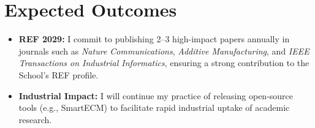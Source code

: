 \documentclass[10pt, a4paper]{article}
\begin{document}
\section*{Expected Outcomes}

\begin{itemize}[leftmargin=*]
    \item \textbf{REF 2029:} I commit to publishing 2--3 high-impact papers annually in journals such as \textit{Nature Communications}, \textit{Additive Manufacturing}, and \textit{IEEE Transactions on Industrial Informatics}, ensuring a strong contribution to the School’s REF profile.
    \item \textbf{Industrial Impact:} I will continue my practice of releasing open-source tools (e.g., SmartECM) to facilitate rapid industrial uptake of academic research.
\end{itemize}
\end{document}
